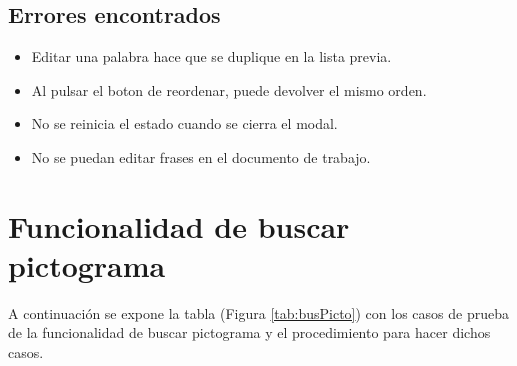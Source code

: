 \subsection{Errores encontrados}
\label{errores:v/f}
\begin{itemize}
    \item Editar una palabra hace que se duplique en la lista previa.
    \item Al pulsar el boton de reordenar, puede devolver el mismo orden.
    \item No se reinicia el estado cuando se cierra el modal.
    \item No se puedan editar frases en el documento de trabajo.
\end{itemize}

\section{Funcionalidad de buscar pictograma}
\label{planPruebas:busPicto}
A continuación se expone la tabla (Figura \ref{tab:busPicto}) con los casos de prueba de la funcionalidad de buscar pictograma y el procedimiento para hacer dichos casos.

\begin{table}[H]
    \centering
    \caption{Casos de prueba de la funcionalidad de buscar pictograma.}
    \label{tab:busPicto}
\end{table}

